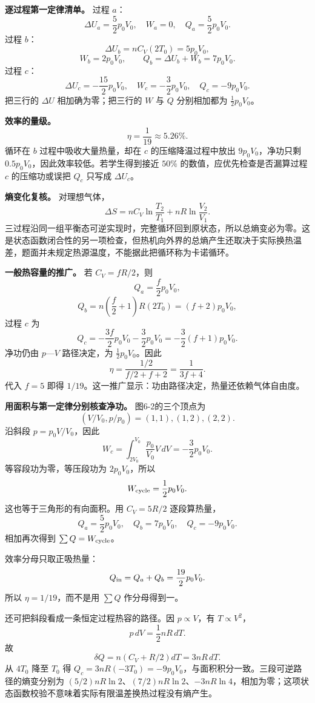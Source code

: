 \documentclass[12pt,a4paper,UTF8]{ctexart}
\begin{document}
\textbf{逐过程第一定律清单。} 过程 \(a\)： \[
\Delta U_a=\frac52p_0V_0,\quad
W_a=0,\quad
Q_a=\frac52p_0V_0.
\] 过程 \(b\)： \[
\Delta U_b
=nC_V(2T_0)
=5p_0V_0,
\] \[
W_b=2p_0V_0,
\qquad
Q_b=\Delta U_b+W_b=7p_0V_0.
\] 过程 \(c\)： \[
\Delta U_c=-\frac{15}{2}p_0V_0,\quad
W_c=-\frac32p_0V_0,\quad
Q_c=-9p_0V_0.
\] 把三行的 \(\Delta U\) 相加确为零；把三行的 \(W\) 与 \(Q\)
分别相加都为 \(\tfrac12p_0V_0\)。

\textbf{效率的量级。} \[
\eta=\frac1{19}\approx5.26\%.
\] 循环在 \(b\) 过程中吸收大量热量，却在 \(c\) 的压缩降温过程中放出
\(9p_0V_0\)，净功只剩 \(0.5p_0V_0\)，因此效率较低。若学生得到接近
\(50\%\) 的数值，应优先检查是否漏算过程 \(c\) 的压缩功或误把 \(Q_c\)
只写成 \(\Delta U_c\)。

\textbf{熵变化复核。} 对理想气体， \[
\Delta S=nC_V\ln\frac{T_2}{T_1}
+nR\ln\frac{V_2}{V_1}.
\]
三过程沿同一组平衡态可逆实现时，完整循环回到原状态，所以总熵变必为零。这是状态函数闭合性的另一项检查，但热机向外界的总熵产生还取决于实际换热温差，题面并未规定热源温度，不能据此把循环称为卡诺循环。

\textbf{一般热容量的推广。} 若 \(C_V=fR/2\)，则 \[
Q_a=\frac f2p_0V_0,
\] \[
Q_b=n\left(\frac f2+1\right)R(2T_0)
=(f+2)p_0V_0,
\] 过程 \(c\) 为 \[
Q_c=-\frac{3f}{2}p_0V_0-\frac32p_0V_0
=-\frac32(f+1)p_0V_0.
\] 净功仍由 \(p\)---\(V\) 路径决定，为 \(\tfrac12p_0V_0\)。因此 \[
\eta
=\frac{1/2}{f/2+f+2}
=\frac1{3f+4}.
\] 代入 \(f=5\) 即得
\(1/19\)。这一推广显示：功由路径决定，热量还依赖气体自由度。

\textbf{用面积与第一定律分别核查净功。} 图6-2的三个顶点为 \[
(V/V_0,p/p_0)=(1,1),(1,2),(2,2).
\] 沿斜段 \(p=p_0V/V_0\)，因此 \[
W_c=\int_{2V_0}^{V_0}\frac{p_0}{V_0}V\,dV=-\frac32p_0V_0.
\] 等容段功为零，等压段功为 \(2p_0V_0\)，所以 \[
W_{\rm cycle}=\frac12p_0V_0.
\] 这也等于三角形的有向面积。用 \(C_V=5R/2\) 逐段算热量， \[
Q_a=\frac52p_0V_0,\quad Q_b=7p_0V_0,\quad Q_c=-9p_0V_0.
\] 相加再次得到 \(\sum Q=W_{\rm cycle}\)。

效率分母只取正吸热量： \[
Q_{\rm in}=Q_a+Q_b=\frac{19}{2}p_0V_0.
\] 所以 \(\eta=1/19\)，而不是用 \(\sum Q\) 作分母得到一。

还可把斜段看成一条恒定过程热容的路径。因 \(p\propto V\)，有
\(T\propto V^2\)， \[
p\,dV=\frac12nR\,dT.
\] 故 \[
\delta Q=n(C_V+R/2)dT=3nR\,dT.
\] 从 \(4T_0\) 降至 \(T_0\) 得
\(Q_c=3nR(-3T_0)=-9p_0V_0\)，与面积积分一致。三段可逆路径的熵变分别为
\((5/2)nR\ln2\)、\((7/2)nR\ln2\)、\(-3nR\ln4\)，相加为零；这项状态函数校验不意味着实际有限温差换热过程没有熵产生。

\newpage
\end{document}
